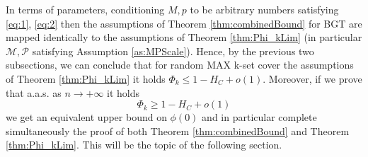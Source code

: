 \documentclass[12pt,reqno]{amsart}
\numberwithin{equation}{section}
\theoremstyle{definition}
\newcommand{\conv}[1]{\overset{#1}{\rightarrow}}
\renewcommand{\[}{\begin{equation}}
\renewcommand{\]}{\end{equation}}
\renewcommand{\|}{\bigg{|}}
\newcommand{\m}{1- \Phi_k}
\newcommand{\kset}{random MAX k-set cover }
\newcommand{\ngrow}{\ensuremath{n \conv{} +\infty} }
\newcommand{\mSet}{\mathcal{M}}
\newcommand{\pSet}{\mathcal{P}}
\begin{document}
In terms of parameters, conditioning $M,p$ to be arbitrary numbers satisfying \eqref{eq:1}, \eqref{eq:2} then the assumptions of Theorem \ref{thm:combinedBound} for BGT are mapped identically to the assumptions of Theorem \ref{thm:Phi_kLim} (in particular $\mSet, \pSet$ satisfying Assumption \ref{as:MPScale}).
Hence, by the previous two subsections, we can conclude that for \kset the assumptions of Theorem \ref{thm:Phi_kLim} it holds $\Phi_k \leq 1-H_C+o(1)$. Moreover, if we prove that a.a.s. as $n \rightarrow +\infty$  it holds \[\Phi_k \geq 1-H_C+o(1) \label{eq:final_s}\] we get an equivalent upper bound on $\phi(0)$ and in particular complete simultaneously the proof of both Theorem \ref{thm:combinedBound} and Theorem \ref{thm:Phi_kLim}. This will be the topic of the following section. 


\end{document}
